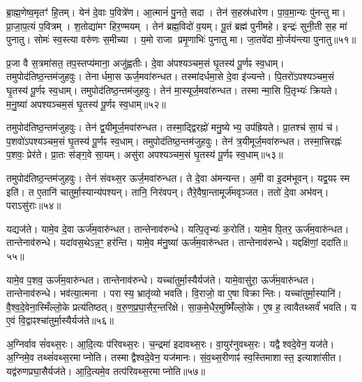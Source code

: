 ब्रा॒ह्म॒णेष्व॒मृतꣳ॑ हि॒तम्।
येन॑ दे॒वाः प॒वित्रे॑ण।
आ॒त्मानं॑ पु॒नते॒ सदा।
तेन॑ स॒हस्र॑धारेण।
पा॒व॒मा॒न्यः पु॑नन्तु मा।
प्रा॒जा॒प॒त्यं प॒वित्रम्।
श॒तोद्या॑मꣳ हिर॒ण्मयम्।
तेन॑ ब्रह्म॒विदो॑ व॒यम्।
पू॒तं ब्रह्म॑ पुनीमहे।
इन्द्रः॑ सुनी॒ती स॒ह मा॑ पुनातु।
सोमः॑ स्व॒स्त्या वरु॑णः स॒मीच्या।
य॒मो राजा प्रमृ॒णाभिः॑ पुनातु मा।
जा॒तवे॑दा मो॒र्जय॑न्त्या पुनातु॥५१॥\anuvakamend[अनु॑ रयी॒णां ब्रह्म॑णा स्व॒स्त्यय॑नीः सु॒दुघा॒ हि घृ॑त॒श्चुत॒ ऋषि॑भिः॒ सम्भृ॑तो॒ रसः॑ पुनातु॒ त्रीणि॑ च]

प्र॒जा वै स॒त्रमा॑सत॒ तप॒स्तप्य॑माना॒ अजु॑ह्वतीः।
दे॒वा अ॑पश्यञ्चम॒सं घृ॒तस्य॑ पू॒र्णꣴ स्व॒धाम्।
तमुपोद॑तिष्ठ॒न्तम॑\-जुहवुः।
तेनार्धमा॒स ऊर्ज॒मवा॑रुन्धत।
तस्मा॑दर्धमा॒से दे॒वा इ॑ज्यन्ते।
पि॒तरो॑\-ऽपश्यञ्चम॒सं घृ॒तस्य॑ पू॒र्णꣴ स्व॒धाम्।
तमुपोद॑तिष्ठ॒न्तम॑जुहवुः।
तेन॑ मा॒स्यूर्ज॒मवा॑रुन्धत।
तस्मान्मा॒सि पि॒तृभ्यः॑ क्रियते।
म॒नु॒ष्या॑ अपश्यञ्चम॒सं घृ॒तस्य॑ पू॒र्णꣴ स्व॒धाम्॥५२॥

तमुपोद॑तिष्ठ॒न्तम॑जुहवुः।
तेन॑ द्व॒यीमूर्ज॒मवा॑रुन्धत।
तस्मा॒द्द्विरह्नो॑ मनु॒ष्येभ्य॒ उप॑ह्रियते।
प्रा॒तश्च॑ सा॒यं च॑।
प॒शवो॑\-ऽपश्यञ्चम॒सं घृ॒तस्य॑ पू॒र्णꣴ स्व॒धाम्।
तमुपोद॑तिष्ठ॒न्त\-म॑जुहवुः।
तेन॑ त्र॒यीमूर्ज॒मवा॑रुन्धत।
तस्मा॒त्त्रिरह्नः॑ प॒शवः॒ प्रेर॑ते।
प्रा॒तः स॑ङ्ग॒वे सा॒यम्।
असु॑रा अपश्यञ्चम॒सं घृ॒तस्य॑ पू॒र्णꣴ स्व॒धाम्॥५३॥

तमुपोद॑तिष्ठ॒न्तम॑जुहवुः।
तेन॑ संवथ्स॒र ऊर्ज॒मवा॑रुन्धत।
ते दे॒वा अ॑मन्यन्त।
अ॒मी वा इ॒दम॑भूवन्।
यद्व॒यꣴ स्म इति॑।
त ए॒तानि॑ चातुर्मा॒स्यान्य॑पश्यन्।
तानि॒ निर॑वपन्।
तैरे॒वैषा॒न्तामूर्ज॑मवृञ्जत।
ततो॑ दे॒वा अभ॑वन्।
पराऽसु॑राः॥५४॥

यद्यज॑ते।
यामे॒व दे॒वा ऊर्ज॑म॒वारु॑न्धत।
तान्तेनाव॑रुन्धे।
यत्पि॒तृभ्यः॑ क॒रोति॑।
यामे॒व पि॒तर॒ ऊर्ज॑म॒वारु॑न्धत।
तान्तेनाव॑रुन्धे।
यदा॑वस॒थे\-ऽन्न॒ꣳ॒ हर॑न्ति।
यामे॒व म॑नु॒ष्या॑ ऊर्ज॑म॒वारु॑न्धत।
तान्तेनाव॑रुन्धे।
यद्दक्षि॑णां॒ ददा॑ति॥५५॥

यामे॒व प॒शव॒ ऊर्ज॑म॒वारु॑न्धत।
तान्तेनाव॑रुन्धे।
यच्चा॑तुर्मा॒स्यैर्\-यज॑ते।
यामे॒वासु॑रा॒ ऊर्ज॑म॒वारु॑न्धत।
तान्तेनाव॑रुन्धे।
भव॑त्या॒त्मना।
परास्य॒ भ्रातृ॑व्यो भवति।
वि॒राजो॒ वा ए॒षा विक्रान्तिः।
यच्चा॑तुर्मा॒स्यानि॑।
वै॒श्व॒दे॒वेना॒स्मिँल्लो॒के प्रत्य॑तिष्ठत्।
व॒रु॒ण॒प्र॒घा॒सैर॒न्तरि॑क्षे।
सा॒क॒मे॒धैर॒मुष्मिँ॑ल्लो॒के।
ए॒ष ह॒ त्वावैतथ्सर्वं॑ भवति।
य ए॒वं वि॒द्वाꣴश्चा॑तुर्मा॒स्यैर्यज॑ते॥५६॥

अ॒ग्निर्वाव सं॑वथ्स॒रः।
आ॒दि॒त्यः प॑रिवथ्स॒रः।
च॒न्द्रमा॑ इदावथ्स॒रः।
वा॒युर॑नुवथ्स॒रः।
यद्वैश्वदे॒वेन॒ यज॑ते।
अ॒ग्निमे॒व तथ्सं॑वथ्स॒रमाप्नोति।
तस्माद्वैश्वदे॒वेन॒ यज॑मानः।
सं॒व॒थ्स॒रीणाꣴ॑ स्व॒स्तिमाशास्त॒ इत्याशा॑सीत।
यद्व॑रुण\-प्रघा॒सैर्यज॑ते।
आ॒दि॒त्यमे॒व तत्प॑रिवथ्स॒रमाप्नोति॥५७॥

